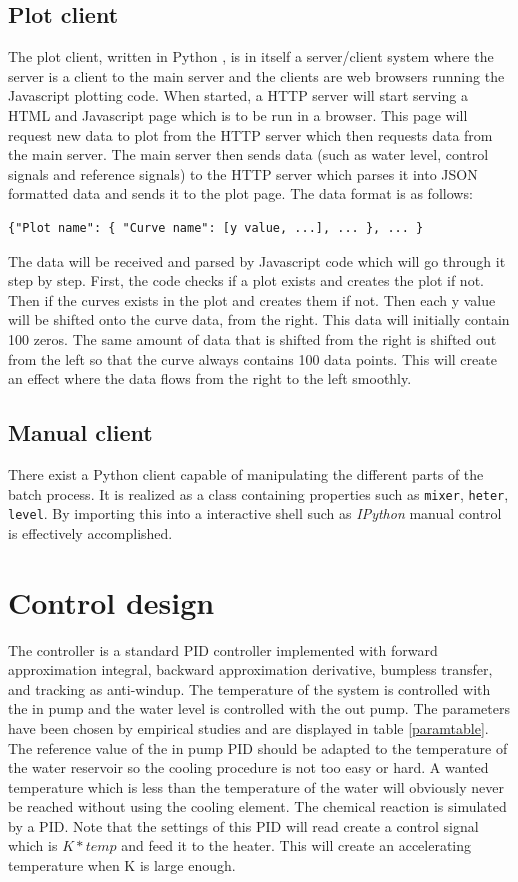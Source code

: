 \documentclass{article}
\begin{document}
\subsection{Plot client}
The plot client, written in Python \cite{python}, is in itself a server/client
system where the server is a client to the main server and the clients are web
browsers running the Javascript plotting code. When started, a HTTP server will
start serving a HTML and Javascript page which is to be run in a browser. This
page will request new data to plot from the HTTP server which then requests data
from the main server. The main server then sends data (such as water level,
control signals and reference signals) to the HTTP server which parses it into
JSON \cite{json} formatted data and sends it to the plot page. The data format is
as follows:
\begin{verbatim}
{"Plot name": { "Curve name": [y value, ...], ... }, ... }
\end{verbatim}
The data will be received and parsed by Javascript code which will go through it
step by step. First, the code checks if a plot exists and creates the plot if
not. Then if the curves exists in the plot and creates them if not. Then each y
value will be shifted onto the curve data, from the right. This data will
initially contain 100 zeros. The same amount of data that is shifted from the
right is shifted out from the left so that the curve always contains 100
data points. This will create an effect where the data flows from the right to
the left smoothly.


\subsection{Manual client}
There exist a Python client capable of manipulating the different parts
of the batch process. It is realized as a class containing properties
such as \verb+mixer+, \verb+heter+, \verb+level+. By importing this into
a interactive shell such as \emph{IPython} manual control is effectively
accomplished.


\section{Control design}
The controller is a standard PID controller implemented with forward
approximation integral, backward approximation derivative, bumpless transfer,
and tracking as anti-windup. The temperature of the system is controlled with
the in pump and the water level is controlled with the out pump.
The parameters have been chosen by empirical
studies and are displayed in table \ref{paramtable}. The reference value of the
in pump PID should be adapted to the temperature of the water reservoir so the 
cooling procedure is not too easy or hard. A wanted temperature which is less
than the temperature of the water will obviously never be reached without using
the cooling element. The chemical reaction is simulated by a PID. Note that the
settings of this PID will read create a control signal which
is $K*temp$ and feed it to the heater. This will create an accelerating 
temperature when K is large enough. 
\end{document}

